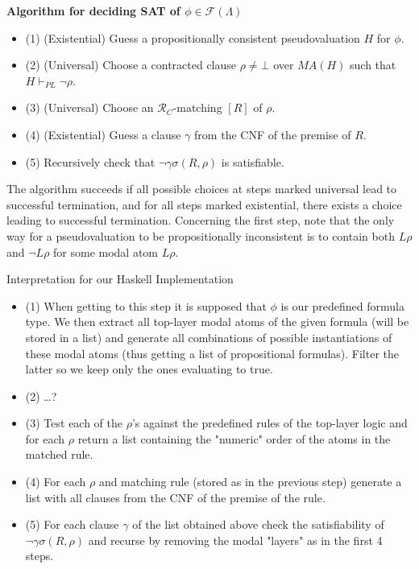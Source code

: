 \documentclass[11pt,final,notitlepage,onecolumn]{article}%
\date{}
\begin{document}
{\bf Algorithm for deciding SAT of $\phi\in\mathcal{F}(\Lambda)$}
\begin{itemize}
\item (1) (Existential) Guess a propositionally consistent pseudovaluation $H$ for $\phi$.
\item (2) (Universal) Choose a contracted clause $\rho\neq\bot$ over $MA(H)$ such that $H\vdash_{PL}\neg\rho$.
\item (3) (Universal) Choose an $\mathcal{R}_C$-matching $[R]$ of $\rho$.
\item (4) (Existential) Guess a clause $\gamma$ from the CNF of the premise of $R$.
\item (5) Recursively check that $\neg\gamma\sigma(R,\rho)$ is satisfiable.
\end{itemize}
The algorithm succeeds if all possible choices at steps marked universal lead to successful termination, and for all steps marked existential, there exists a choice leading to successful termination. Concerning the first step, note that the only way for a pseudovaluation to be propositionally inconsistent is to contain both $L\rho$ and $\neg L\rho$ for some modal atom $L\rho$.

\bigskip

Interpretation for our Haskell Implementation
\begin{itemize}
\item (1) When getting to this step it is supposed that $\phi$ is our predefined formula type. We then extract all top-layer modal atoms of the given formula (will be stored in a list) and generate all combinations of possible instantiations of these modal atoms (thus getting a list of propositional formulas). Filter the latter so we keep only the ones evaluating to true.
\item (2) \ldots ?
\item (3) Test each of the $\rho$'s against the predefined rules of the top-layer logic and for each $\rho$ return a list containing the "numeric" order of the atoms in the matched rule.
\item (4) For each $\rho$ and matching rule (stored as in the previous step) generate a list with all clauses from the CNF of the premise of the rule.
\item (5) For each clause $\gamma$ of the list obtained above check the satisfiability of $\neg\gamma\sigma(R,\rho)$ and recurse by removing the modal "layers" as in the first 4 steps.
\end{itemize}

\bigskip
\end{document}
